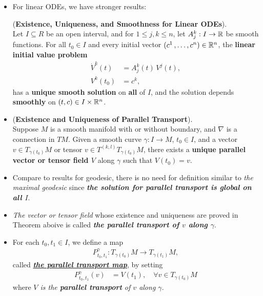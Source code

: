 \documentclass[11pt]{article}
\begin{document}
\begin{itemize}
\item For linear ODEs, we have stronger results:
\begin{theorem} (\textbf{Existence, Uniqueness, and Smoothness for Linear ODEs}). \citep{lee2018introduction} \\
Let $I \subseteq R$ be an open interval, and for $1 \le j, k \le n$, let $A_j^k: I \rightarrow {\mathbb R}$ be smooth functions. For all $t_0 \in I$ and every initial vector $(c^1 \,{,}\ldots{,}\, c^n) \in {\mathbb R}^n$, the \textbf{linear initial value problem}
\begin{align}
\dot{V}^k(t) &= A_j^{k}(t)\, V^j(t),  \label{eqn: linear_ode} \\
V^k(t_0) &= c^k, \nonumber
\end{align} has a \textbf{unique smooth solution} on \textbf{all} of $I$, and the solution depends \textbf{smoothly} on $(t, c) \in I \times {\mathbb R}^n$.
\end{theorem}

\item \begin{theorem} (\textbf{Existence and Uniqueness of Parallel Transport}). \\
Suppose $M$ is a smooth manifold with or without boundary, and $\nabla$ is a connection in $TM$. Given a smooth curve $\gamma: I \rightarrow M$, $t_0 \in I$, and a vector $v \in T_{\gamma(t_0)}M$ or tensor $v \in T^{(k,l)}T_{\gamma(t_0)}M$, there exists a \textbf{unique parallel vector or tensor field $V$} along $\gamma$ such that $V(t_0) = v$.
\end{theorem}

\item \begin{remark}
Compare to results for geodesic, there is no need for definition similar to \emph{the maximal geodesic} since \emph{\textbf{the solution for parallel transport is global on all $I$}}.
\end{remark}

\item \begin{remark}
\emph{The vector or tensor field} whose existence and uniqueness are proved in Theorem aboive is called \emph{\textbf{the parallel transport of $v$ along $\gamma$}}.
\end{remark}

\item \begin{definition}
For each $t_0, t_1 \in I$, we define a map 
\begin{align}
P^{\gamma}_{t_0, t_1}: T_{\gamma(t_0)}M \rightarrow T_{\gamma(t_1)}M,  \label{eqn: parallel_transport_map}
\end{align} called \underline{\emph{\textbf{the parallel transport map}}}, by setting 
\begin{align*}
P^{\gamma}_{t_0, t_1}(v) &= V(t_1), \quad \forall v \in T_{\gamma(t_0)}M
\end{align*} where \emph{$V$ is the \textbf{parallel transport} of $v$ along $\gamma$}. 


\end{definition}
\end{itemize}
\end{document}
